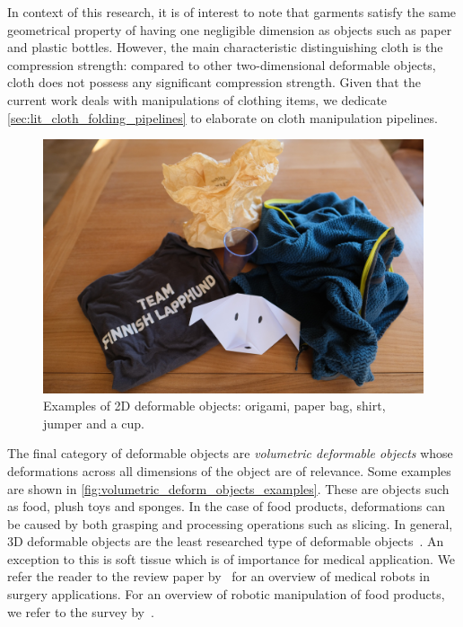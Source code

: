 In context of this research, it is of interest to note that garments satisfy the same geometrical property of having one negligible dimension as objects such as paper and plastic bottles. However, the main characteristic distinguishing cloth is the compression strength: compared to other two-dimensional deformable objects, cloth does not possess any significant compression strength. Given that the current work deals with manipulations of clothing items, we dedicate \cref{sec:lit_cloth_folding_pipelines} to elaborate on cloth manipulation pipelines.

\begin{figure}[htbp!]
    \centering
    \includegraphics[keepaspectratio,width=\textwidth]{figures/fig_2d_deformables_ex.JPG}
    \caption{Examples of 2D deformable objects: origami, paper bag, shirt, jumper and a cup.}
     \label{fig:planar_deform_objects_examples}
\end{figure}

The final category of deformable objects are \textit{volumetric deformable objects} whose deformations across all dimensions of the object are of relevance. Some examples are shown in \cref{fig:volumetric_deform_objects_examples}. These are objects such as food, plush toys and sponges. In the case of food products, deformations can be caused by both grasping and processing operations such as slicing. In general, 3D deformable objects are the least researched type of deformable objects~\autocite{Sanchez2018}. An exception to this is soft tissue which is of importance for medical application. We refer the reader to the review paper by~\textcite{Taylor2016} for an overview of medical robots in surgery applications. For an overview of robotic manipulation of food products, we refer to the survey by~\textcite{Chua2003}.

